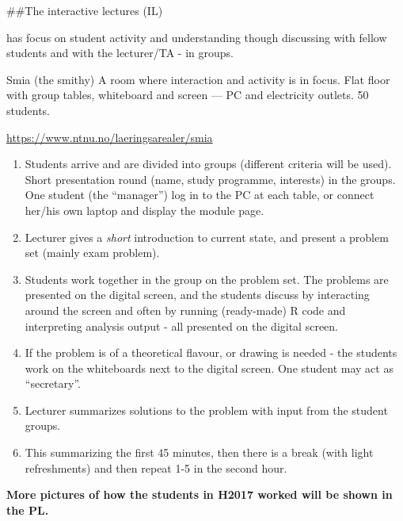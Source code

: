 \documentclass[
  ignorenonframetext,
]{beamer}
\begin{document}
\begin{frame}
\#\#The interactive lectures (IL)

has focus on student activity and understanding though discussing with
fellow students and with the lecturer/TA - in groups.

\begin{block}{Smia (the smithy)}
\protect\hypertarget{smia-the-smithy}{}
A room where interaction and activity is in focus. Flat floor with group
tables, whiteboard and screen --- PC and electricity outlets. 50
students.

\tiny \url{https://www.ntnu.no/laeringsarealer/smia}\normalsize
\end{block}
\end{frame}

\begin{frame}
\begin{enumerate}
\item
  Students arrive and are divided into groups (different criteria will
  be used). Short presentation round (name, study programme, interests)
  in the groups. One student (the ``manager'') log in to the PC at each
  table, or connect her/his own laptop and display the module page.
\item
  Lecturer gives a \emph{short} introduction to current state, and
  present a problem set (mainly exam problem).
\end{enumerate}
\end{frame}

\begin{frame}
\begin{enumerate}
\setcounter{enumi}{2}
\item
  Students work together in the group on the problem set. The problems
  are presented on the digital screen, and the students discuss by
  interacting around the screen and often by running (ready-made) R code
  and interpreting analysis output - all presented on the digital
  screen.
\item
  If the problem is of a theoretical flavour, or drawing is needed - the
  students work on the whiteboards next to the digital screen. One
  student may act as ``secretary''.
\end{enumerate}
\end{frame}

\begin{frame}
\begin{enumerate}
\setcounter{enumi}{4}
\item
  Lecturer summarizes solutions to the problem with input from the
  student groups.
\item
  This summarizing the first 45 minutes, then there is a break (with
  light refreshments) and then repeat 1-5 in the second hour.
\end{enumerate}

\textbf{More pictures of how the students in H2017 worked will be shown
in the PL.}
\end{frame}
\end{document}
